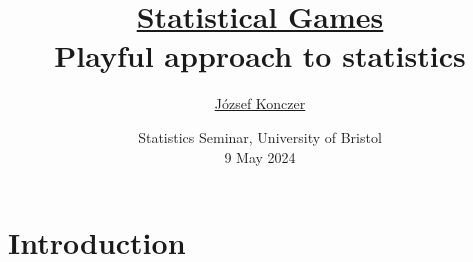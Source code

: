 \documentclass{beamer}
\theoremstyle{definition}
\begin{document}



\title[\href{https://arxiv.org/abs/2402.15892}{Statistical Games}]{\href{https://arxiv.org/abs/2402.15892}{Statistical Games} \\ {\small Playful approach to statistics}}
\author{\href{https://konczer.github.io/}{József Konczer}}
\date{Statistics Seminar, University of Bristol \\ 9 May 2024}

\begin{frame}
\titlepage
\end{frame}





\section{Introduction}
\end{document}
